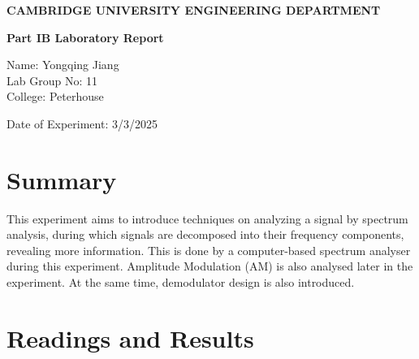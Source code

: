 \documentclass[12pt]{article}[times]
\begin{document}

\begin{center}
\Large{\bf CAMBRIDGE UNIVERSITY ENGINEERING DEPARTMENT}
\end{center}

\vskip 1cm

\begin{center}
\large{\bf Part IB Laboratory Report}
\end{center}




\vskip 1cm
\begin{center}
\end{center}


\vskip 3cm

\begin{center}

Name: Yongqing Jiang \\
\vskip 0.2cm
 Lab Group No: 11 \\
\vskip 0.2cm
 College: Peterhouse \\
  \vskip 0.2cm

%
Date of Experiment: 3/3/2025
%
\end{center}

\vskip 3cm
\newpage

\section{Summary}
This experiment aims to introduce techniques on analyzing a
signal by spectrum analysis, during which signals are decomposed into 
their frequency components, revealing more information. This is done by a 
computer-based spectrum analyser during this experiment.
Amplitude Modulation (AM) is also analysed later in the experiment. At the same
time, demodulator design is also introduced.
\section{Readings and Results}
\end{document}
